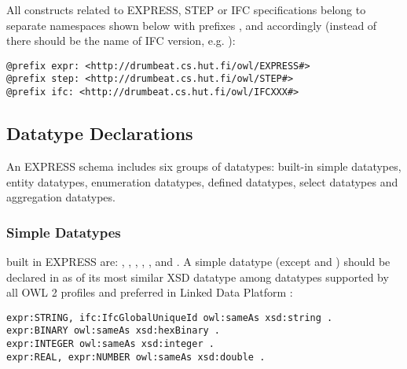 All constructs related to EXPRESS, STEP or IFC specifications belong to separate namespaces shown below with prefixes ,  and  accordingly (instead of  there should be the name of IFC version, e.g. ):

\begin{lstlisting}
@prefix expr: <http://drumbeat.cs.hut.fi/owl/EXPRESS#>
@prefix step: <http://drumbeat.cs.hut.fi/owl/STEP#>
@prefix ifc: <http://drumbeat.cs.hut.fi/owl/IFCXXX#>
\end{lstlisting}




\subsection{Datatype Declarations}
\label{subsec:ifcOWL-types}

An EXPRESS schema includes six groups of data\-types: built-in simple data\-types, entity data\-types, enumeration data\-types, defined data\-types, select data\-types and aggregation data\-types.



\subsubsection{Simple Datatypes} built in EXPRESS are: , , , , ,  and . A simple data\-type (except  and ) should be declared in \ifcowl{} as  of its most similar XSD data\-type among data\-types supported by all OWL 2 profiles \cite{motik2012owl} and preferred in Linked Data Platform \cite{ldp-best-practices}:

\begin{lstlisting}
expr:STRING, ifc:IfcGlobalUniqueId owl:sameAs xsd:string .
expr:BINARY owl:sameAs xsd:hexBinary .
expr:INTEGER owl:sameAs xsd:integer .
expr:REAL, expr:NUMBER owl:sameAs xsd:double .
\end{lstlisting}

